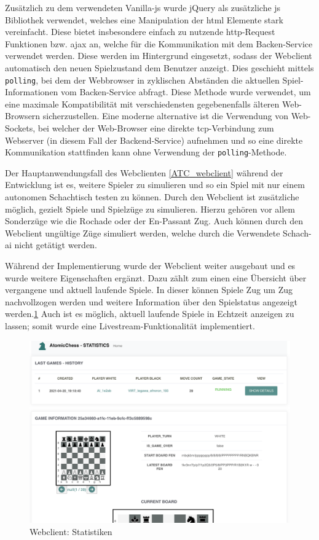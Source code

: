 Zusätzlich zu dem verwendeten Vanilla-\gls{js} wurde jQuery als
zusätzliche \gls{js} Bibliothek verwendet, welches eine Manipulation der
\gls{html} Elemente stark vereinfacht. Diese bietet insbesondere einfach
zu nutzende \gls{http}-Request Funktionen bzw. \gls{ajax} an, welche für
die Kommunikation mit dem Backen-Service verwendet werden. Diese werden
im Hintergrund eingesetzt, sodass der Webclient automatisch den neuen
Spielzustand dem Benutzer anzeigt. Dies geschieht mittels
\passthrough{\lstinline!polling!}, bei dem der Webbrowser in zyklischen
Abständen die aktuellen Spiel-Informationen vom Backen-Service abfragt.
Diese Methode wurde verwendet, um eine maximale Kompatibilität mit
verschiedensten gegebenenfalls älteren Web-Browsern sicherzustellen.
Eine moderne alternative ist die Verwendung von Web-Sockets, bei welcher
der Web-Browser eine direkte \gls{tcp}-Verbindung zum Webserver (in
diesem Fall der Backend-Service) aufnehmen und so eine direkte
Kommunikation stattfinden kann ohne Verwendung der
\passthrough{\lstinline!polling!}-Methode.

Der Hauptanwendungsfall des Webclienten \ref{ATC_webclient} während der
Entwicklung ist es, weitere Spieler zu simulieren und so ein Spiel mit
nur einem autonomen Schachtisch testen zu können. Durch den Webclient
ist zusätzliche möglich, gezielt Spiele und Spielzüge zu simulieren.
Hierzu gehören vor allem Sonderzüge wie die Rochade oder der En-Passant
Zug. Auch können durch den Webclient ungültige Züge simuliert werden,
welche durch die Verwendete Schach-\gls{ai} nicht getätigt werden.

Während der Implementierung wurde der Webclient weiter ausgebaut und es
wurde weitere Eigenschaften ergänzt. Dazu zählt zum einen eine Übersicht
über vergangene und aktuell laufende Spiele. In dieser können Spiele Zug
um Zug nachvollzogen werden und weitere Information über den Spielstatus
angezeigt werden.\ref{ATC_statistics} Auch ist es möglich, aktuell
laufende Spiele in Echtzeit anzeigen zu lassen; somit wurde eine
Livestream-Funktionalität implementiert.

\begin{figure}
\centering
\includegraphics{images/ATC_statistics.png}
\caption{Webclient: Statistiken \label{ATC_statistics}}
\end{figure}

